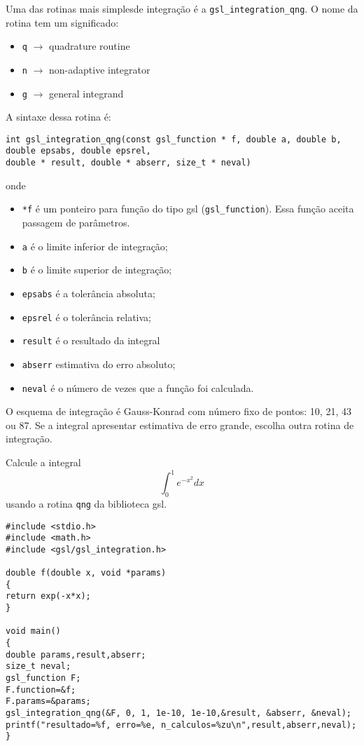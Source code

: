 Uma das rotinas mais simplesde integração é a \verb|gsl_integration_qng|. O nome da rotina tem um significado: 
\begin{itemize}
 \item \verb|q| $\rightarrow$ quadrature routine
 \item \verb|n| $\rightarrow$ non-adaptive integrator
 \item \verb|g| $\rightarrow$ general integrand
\end{itemize}
A sintaxe dessa rotina é:
\begin{verbatim}
int gsl_integration_qng(const gsl_function * f, double a, double b, double epsabs, double epsrel, 
double * result, double * abserr, size_t * neval) 
\end{verbatim}
onde
\begin{itemize}
\item \verb|*f| é um ponteiro para função do tipo gsl (\verb|gsl_function|). Essa função aceita passagem de parâmetros.
 \item \verb|a| é o limite inferior de integração;
  \item \verb|b| é o limite superior de integração;
 \item \verb|epsabs| é a tolerância absoluta;
 \item \verb|epsrel| é o tolerância relativa;
 \item \verb|result| é o resultado da integral
 \item \verb|abserr| estimativa do erro absoluto;
 \item \verb|neval| é o número de vezes que a função foi calculada.
\end{itemize}
O esquema de integração é Gauss-Konrad com número fixo de pontos: 10, 21, 43 ou 87. Se a integral apresentar estimativa de erro grande, escolha outra rotina de integração.
\begin{ex}
Calcule a integral
$$
\int_0^1 e^{-x^2}dx
$$
usando a rotina \verb|qng| da biblioteca gsl.
\end{ex}
\begin{verbatim}
#include <stdio.h>
#include <math.h>
#include <gsl/gsl_integration.h>

double f(double x, void *params)
{
return exp(-x*x);
}

void main()
{
double params,result,abserr;
size_t neval;
gsl_function F;
F.function=&f;
F.params=&params;
gsl_integration_qng(&F, 0, 1, 1e-10, 1e-10,&result, &abserr, &neval);
printf("resultado=%f, erro=%e, n_calculos=%zu\n",result,abserr,neval);
}
\end{verbatim}
